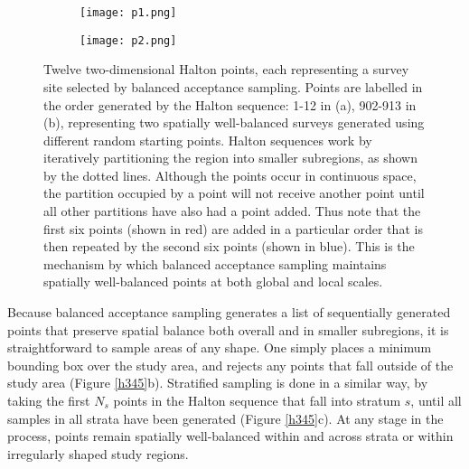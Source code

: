\documentclass[a4paper,11pt, draft]{article} %
\begin{document}
\begin{figure}[htbp]
\centering
  \begin{subfigure}[b]{0.45\textwidth}
    \texttt{[image: p1.png]}
    \caption{}
  \end{subfigure}
  \begin{subfigure}[b]{0.45\textwidth}
    \texttt{[image: p2.png]}
    \caption{}
  \end{subfigure}
\caption{Twelve two-dimensional Halton points, each representing a survey site selected by balanced acceptance sampling. Points are labelled in the order generated by the Halton sequence: 1-12 in (a), 902-913 in (b), representing two spatially well-balanced surveys generated using different random starting points. Halton sequences work by iteratively partitioning the region into smaller subregions, as shown by the dotted lines. Although the points occur in continuous space, the partition occupied by a point will not receive another point until all other partitions have also had a point added. Thus note that the first six points (shown in red) are added in a particular order that is then repeated by the second six points (shown in blue). This is the mechanism by which balanced acceptance sampling maintains spatially well-balanced points at both global and local scales.}
  \label{h12}
\end{figure}

Because balanced acceptance sampling generates a list of sequentially generated points that preserve spatial balance both overall and in smaller subregions, it is straightforward to sample areas of any shape. One simply places a minimum bounding box over the study area, and rejects any points that fall outside of the study area (Figure \ref{h345}b). Stratified sampling is done in a similar way, by taking the first $N_s$ points in the Halton sequence that fall into stratum $s$, until all samples in all strata have been generated (Figure \ref{h345}c). At any stage in the process, points remain spatially well-balanced within and across strata or within irregularly shaped study regions.
\end{document}
